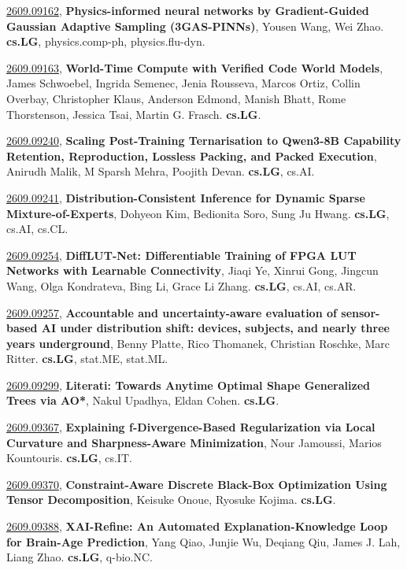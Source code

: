 \documentclass[9pt, a4paper]{article}
\theoremstyle{plain}
\theoremstyle{definition}
\theoremstyle{remark}
\newcommand{\arxivwithtarget}[3]{\hypertarget{#1}{}\href{https://arxiv.org/abs/#1}{#1}, \textbf{\textcolor{arxivblue}{#2}}, #3. }
\begin{document}
\arxivwithtarget{2609.09162}{Physics-informed neural networks by Gradient-Guided Gaussian Adaptive Sampling (3GAS-PINNs)}{Yousen Wang, Wei Zhao}\textbf{cs.LG}, physics.comp-ph, physics.flu-dyn.



\arxivwithtarget{2609.09163}{World-Time Compute with Verified Code World Models}{James Schwoebel, Ingrida Semenec, Jenia Rousseva, Marcos Ortiz, Collin Overbay, Christopher Klaus, Anderson Edmond, Manish Bhatt, Rome Thorstenson, Jessica Tsai, Martin G. Frasch}\textbf{cs.LG}.



\arxivwithtarget{2609.09240}{Scaling Post-Training Ternarisation to Qwen3-8B Capability Retention, Reproduction, Lossless Packing, and Packed Execution}{Anirudh Malik, M Sparsh Mehra, Poojith Devan}\textbf{cs.LG}, cs.AI.



\arxivwithtarget{2609.09241}{Distribution-Consistent Inference for Dynamic Sparse Mixture-of-Experts}{Dohyeon Kim, Bedionita Soro, Sung Ju Hwang}\textbf{cs.LG}, cs.AI, cs.CL.



\arxivwithtarget{2609.09254}{DiffLUT-Net: Differentiable Training of FPGA LUT Networks with Learnable Connectivity}{Jiaqi Ye, Xinrui Gong, Jingcun Wang, Olga Kondrateva, Bing Li, Grace Li Zhang}\textbf{cs.LG}, cs.AI, cs.AR.



\arxivwithtarget{2609.09257}{Accountable and uncertainty-aware evaluation of sensor-based AI under distribution shift: devices, subjects, and nearly three years underground}{Benny Platte, Rico Thomanek, Christian Roschke, Marc Ritter}\textbf{cs.LG}, stat.ME, stat.ML.



\arxivwithtarget{2609.09299}{Literati: Towards Anytime Optimal Shape Generalized Trees via AO*}{Nakul Upadhya, Eldan Cohen}\textbf{cs.LG}.



\arxivwithtarget{2609.09367}{Explaining f-Divergence-Based Regularization via Local Curvature and Sharpness-Aware Minimization}{Nour Jamoussi, Marios Kountouris}\textbf{cs.LG}, cs.IT.



\arxivwithtarget{2609.09370}{Constraint-Aware Discrete Black-Box Optimization Using Tensor Decomposition}{Keisuke Onoue, Ryosuke Kojima}\textbf{cs.LG}.



\arxivwithtarget{2609.09388}{XAI-Refine: An Automated Explanation-Knowledge Loop for Brain-Age Prediction}{Yang Qiao, Junjie Wu, Deqiang Qiu, James J. Lah, Liang Zhao}\textbf{cs.LG}, q-bio.NC.
\end{document}
